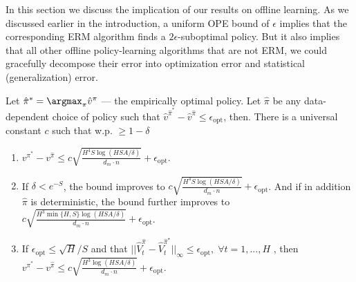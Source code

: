



In this section we discuss the implication of our results on offline learning. As we discussed earlier in the introduction, a uniform OPE bound of $\epsilon$ implies that the corresponding ERM algorithm finds a $2\epsilon$-suboptimal policy.  But it also implies that all other offline policy-learning algorithms that are not ERM, we could gracefully decompose their error into optimization error and statistical  (generalization) error. 
\begin{theorem}\label{thm:offlinelearning}
	Let $\hat{\pi}^* = \argmax_{\pi} \hat{v}^{\pi}$ --- the empirically optimal policy. Let $\hat{\pi}$ be any data-dependent choice of policy such that $\hat{v}^{\hat{\pi}^*} - \hat{v}^{\hat{\pi}} \leq \epsilon_\text{opt}$, then. There is a universal constant $c$ such that w.p. $\geq 1-\delta$ 
	\begin{enumerate}
		\itemsep1pt
		\item 	$
		v^{\pi^*}  - v^{\hat{\pi}} \leq c\sqrt{\frac{H^4S\log(HSA/\delta)}{d_m \cdot n}} + \epsilon_\text{opt}.
		$
		\item If  $\delta< e^{-S}$, the bound improves to $c\sqrt{\frac{H^4S\log(HSA/\delta)}{d_m \cdot n}} +  \epsilon_\text{opt}$. And if in addition $\hat{\pi}$ is deterministic, the bound further improves to 
		$c\sqrt{\frac{H^3\min\{H,S\}\log(HSA/\delta)}{d_m \cdot n}} +  \epsilon_\text{opt}$.
		\item If $\epsilon_\text{opt}\leq \sqrt{H}/S$ and that 
		$||\widehat{V}^{\hat{\pi}}_t-\widehat{V}^{\widehat{\pi}^\star}_t ||_\infty\leq\epsilon_\text{opt},\;\forall t=1,...,H$
		, then 
		$
		v^{\pi^*}  - v^{\hat{\pi}} \leq c\sqrt{\frac{H^3\log(HSA/\delta)}{d_m \cdot n}} + \epsilon_\text{opt}.
		$
	\end{enumerate}
\end{theorem}

